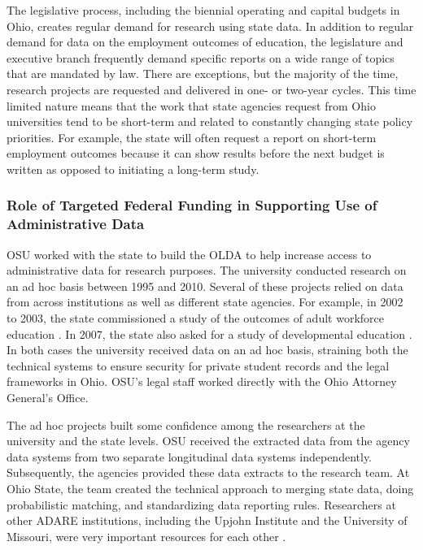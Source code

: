 \documentclass[
]{book}
\begin{document}
The legislative process, including the biennial operating and capital budgets in Ohio, creates regular demand for research using state data. In addition to regular demand for data on the employment outcomes of education, the legislature and executive branch frequently demand specific reports on a wide range of topics that are mandated by law. There are exceptions, but the majority of the time, research projects are requested and delivered in one- or two-year cycles. This time limited nature means that the work that state agencies request from Ohio universities tend to be short-term and related to constantly changing state policy priorities. For example, the state will often request a report on short-term employment outcomes because it can show results before the next budget is written as opposed to initiating a long-term study.

\hypertarget{role-of-targeted-federal-funding-in-supporting-use-of-administrative-data}{%
\subsubsection*{Role of Targeted Federal Funding in Supporting Use of Administrative Data}\label{role-of-targeted-federal-funding-in-supporting-use-of-administrative-data}}

OSU worked with the state to build the OLDA to help increase access to administrative data for research purposes. The university conducted research on an ad hoc basis between 1995 and 2010. Several of these projects relied on data from across institutions as well as different state agencies. For example, in 2002 to 2003, the state commissioned a study of the outcomes of adult workforce education \citep{hawley2003, hawley2003a, hawley2005}. In 2007, the state also asked for a study of developmental education \citep{hawley2013, hawley2017}. In both cases the university received data on an ad hoc basis, straining both the technical systems to ensure security for private student records and the legal frameworks in Ohio. OSU's legal staff worked directly with the Ohio Attorney General's Office.

The ad hoc projects built some confidence among the researchers at the university and the state levels. OSU received the extracted data from the agency data systems from two separate longitudinal data systems independently. Subsequently, the agencies provided these data extracts to the research team. At Ohio State, the team created the technical approach to merging state data, doing probabilistic matching, and standardizing data reporting rules. Researchers at other ADARE institutions, including the Upjohn Institute and the University of Missouri, were very important resources for each other \citep{stevens2012}.
\end{document}
